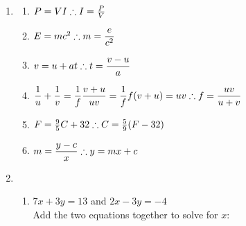 \begin{eocsolutions}{}
{\begin{enumerate}[itemsep=7pt, label=\textbf{\arabic*}. ]
\begin{multicols}{2}
\begin{enumerate}[itemsep=6pt,label=\textbf{(\alph*)}]
\item $\dfrac{1-a}{2} - \dfrac{2-a}{3} \geq 1\\
\dfrac{1-a}{2} - \dfrac{(2+a)}{3} \geq 1\\
3-3a-4-2a \geq 6\\
-5a \geq 7\\
\therefore~ a \leq -\frac{7}{5}$
\item $-5 \leq 2k + 1 < 5\\
-6 \leq 2k < 4\\
\therefore -3 \leq k < 2$
\item $x-1=\dfrac{42}{x}\\$
Note that $x \neq 0$.\\
$x^2-x=42\\
x^2-x-42=0\\
(x-7)(x+6)=0\\
\therefore x=7$ or $x=-6$
\end{enumerate}
\end{multicols}
\item
\begin{multicols}{2}
\begin{enumerate}[itemsep=6pt,label=\textbf{(\alph*)}]
\item $P = VI\\
\therefore I =\frac{P}{V}$
\item $E=mc^{2}\\[4pt]
\therefore m=\dfrac{e}{c^2}$
\item $v = u + at\\[4pt]
\therefore t = \dfrac{v-u}{a}$
\item $\dfrac{1}{u} + \dfrac{1}{v} = \dfrac{1}{f}\\
\dfrac{v+u}{uv} = \dfrac{1}{f}\\
f(v+u) = uv\\[4pt]
\therefore f= \dfrac{uv}{u+v}$
\item  $F=\frac{9}{5}C + 32\\
\therefore C=\frac{5}{9}(F-32)$
\item $m = \dfrac{y-c}{x}\\[4pt]
\therefore y = mx+c$
\end{enumerate}
\end{multicols}
\item 
\begin{enumerate}[itemsep=5pt,label=\textbf{(\alph*)}]
\item $7x+3y=13$ and $2x-3y=-4$\\
Add the two equations together to solve for $x$:\\


\end{enumerate}
\end{enumerate}}
\end{eocsolutions}
